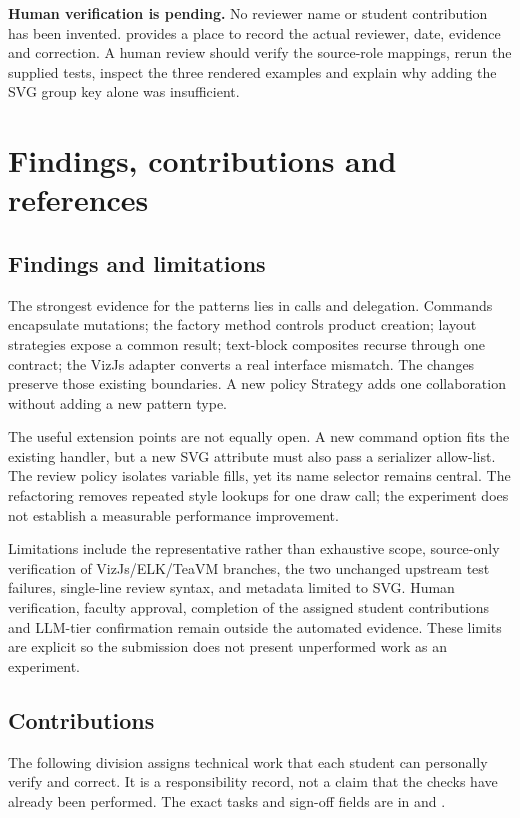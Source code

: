 \documentclass[11pt,a4paper]{article}
\begin{document}
\textbf{Human verification is pending.} No reviewer name or student contribution
has been invented.  provides a place to record
the actual reviewer, date, evidence and correction. A human review should verify
the source-role mappings, rerun the supplied tests, inspect the three rendered
examples and explain why adding the SVG group key alone was insufficient.

\section{Findings, contributions and references}
\subsection{Findings and limitations}
The strongest evidence for the patterns lies in calls and delegation. Commands
encapsulate mutations; the factory method controls product creation; layout
strategies expose a common result; text-block composites recurse through one
contract; the VizJs adapter converts a real interface mismatch. The changes
preserve those existing boundaries. A new policy Strategy adds one collaboration
without adding a new pattern type.

The useful extension points are not equally open. A new command option fits the
existing handler, but a new SVG attribute must also pass a serializer allow-list.
The review policy isolates variable fills, yet its name selector remains central.
The refactoring removes repeated style lookups for one draw call; the experiment
does not establish a measurable performance improvement.

Limitations include the representative rather than exhaustive scope, source-only
verification of VizJs/ELK/TeaVM branches, the two unchanged upstream test failures,
single-line review syntax, and metadata limited to SVG. Human verification,
faculty approval, completion of the assigned student contributions and LLM-tier
confirmation remain outside the automated evidence. These limits are explicit so the submission does
not present unperformed work as an experiment.

\subsection{Contributions}
The following division assigns technical work that each student can personally
verify and correct. It is a responsibility record, not a claim that the checks
have already been performed. The exact tasks and sign-off fields are in
 and .
\end{document}
